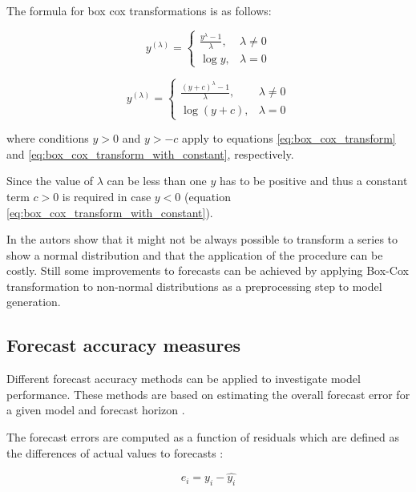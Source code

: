 The formula for box cox transformations is as follows: 


\begin{equation}
	y^{(\lambda)} = 
	\begin{cases}
		\frac{y^\lambda - 1}{\lambda}, & \lambda \neq 0 \\
		\log y, & \lambda = 0
	\end{cases}
	\label{eq:box_cox_transform}
\end{equation}

\begin{equation}
	y^{(\lambda)} = 
	\begin{cases}
		\frac{(y + c)^\lambda - 1}{\lambda}, & \lambda \neq 0 \\
		\log (y + c), & \lambda = 0
	\end{cases}
	\label{eq:box_cox_transform_with_constant}
\end{equation}

where conditions $y > 0$ and $y > -c$ apply to equations \ref{eq:box_cox_transform} and \ref{eq:box_cox_transform_with_constant}, respectively. 

Since the value of $\lambda$ can be less than one $y$ has to be positive and thus a constant term $c > 0$ is required in case $y < 0$ (equation  \ref{eq:box_cox_transform_with_constant}). 

In \cite{nelson1979experience} the autors show that it might not be always possible to transform a series to show a normal distribution and that the application of the procedure can be costly. Still some improvements to forecasts can be achieved by applying Box-Cox transformation to non-normal distributions as a preprocessing step to model generation. 


\subsection{Forecast accuracy measures} \label{ssec:forecast_acc_measures}

Different forecast accuracy methods can be applied to investigate model performance. These methods are based on estimating the overall forecast error for a given model and forecast horizon \cite{hyndman2012forecasting, weron2007modeling}. 

The forecast errors are computed as a function of residuals which are defined as the differences of actual values to forecasts \cite{hyndman2012forecasting}: 

\begin{equation}
	e_i = y_i - \hat{y_i}
\label{eq:residuals}
\end{equation}

